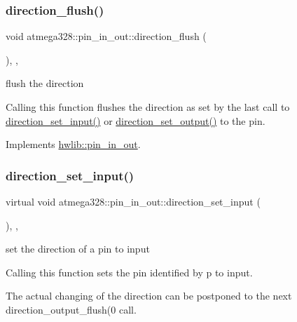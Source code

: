 \subsubsection{\texorpdfstring{direction\+\_\+flush()}{direction\_flush()}}
{\footnotesize\ttfamily void atmega328\+::pin\+\_\+in\+\_\+out\+::direction\+\_\+flush (\begin{DoxyParamCaption}{ }\end{DoxyParamCaption})\hspace{0.3cm}{\ttfamily [inline]}, {\ttfamily [override]}, {\ttfamily [virtual]}}

flush the direction

Calling this function flushes the direction as set by the last call to \hyperlink{classatmega328_1_1pin__in__out_a34896fc52b64f2a3c6d731e3cf0d75ca}{direction\+\_\+set\+\_\+input()} or \hyperlink{classatmega328_1_1pin__in__out_acb994ef07be4c36fc8742d67f95ac6d4}{direction\+\_\+set\+\_\+output()} to the pin. 

Implements \hyperlink{classhwlib_1_1pin__in__out_a86ef2b296683d8c0133280075c82cb51}{hwlib\+::pin\+\_\+in\+\_\+out}.

\mbox{\label{classatmega328_1_1pin__in__out_a34896fc52b64f2a3c6d731e3cf0d75ca}} 
\subsubsection{\texorpdfstring{direction\+\_\+set\+\_\+input()}{direction\_set\_input()}}
{\footnotesize\ttfamily virtual void atmega328\+::pin\+\_\+in\+\_\+out\+::direction\+\_\+set\+\_\+input (\begin{DoxyParamCaption}{ }\end{DoxyParamCaption})\hspace{0.3cm}{\ttfamily [inline]}, {\ttfamily [override]}, {\ttfamily [virtual]}}

set the direction of a pin to input

Calling this function sets the pin identified by p to input.

The actual changing of the direction can be postponed to the next direction\+\_\+output\+\_\+flush(0 call. 

